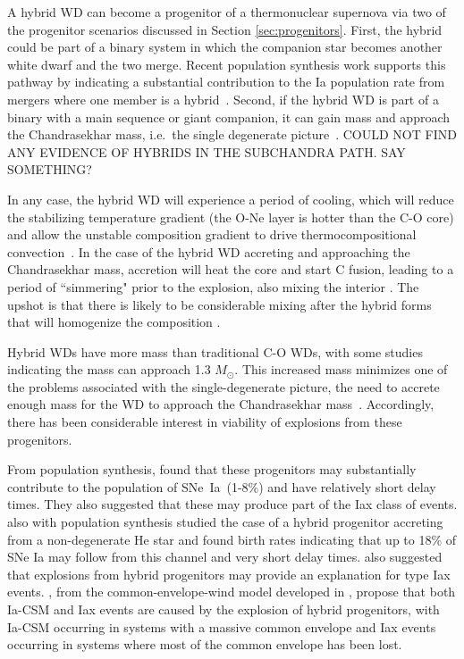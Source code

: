 \documentclass[iop,apj]{emulateapj}
\newcommand{\SNeIa}{SNe~Ia}
\newcommand{\Msun}{\ensuremath{M_\odot}}
\begin{document}
A hybrid WD can become a progenitor of a thermonuclear supernova via two
of the progenitor scenarios discussed in Section \ref{sec:progenitors}.
First, the hybrid could be part of a binary system in which the companion star becomes
another white dwarf and the two merge. Recent population synthesis work supports
this pathway by indicating a substantial contribution to the Ia population rate from
mergers where one member is a hybrid~\citep{yungelsonkuranov2017}. Second, if the hybrid
WD is part of a binary with a main sequence or giant companion, it can gain mass and
approach the Chandrasekhar mass, i.e.\  the single degenerate picture~\citep{willcoxetal2016}.
{\color{red} COULD NOT FIND ANY EVIDENCE OF HYBRIDS IN THE SUBCHANDRA PATH. SAY
SOMETHING?}

In any case, the hybrid WD will experience a period of cooling,
which will reduce the stabilizing temperature gradient (the O-Ne layer is hotter 
than the C-O core) and allow the unstable composition gradient to drive 
thermocompositional convection~\citep{brooksetal2017,schwabgaraud2019}.
In the case of the
hybrid WD accreting and approaching the Chandrasekhar mass, accretion will
heat the core and start C fusion, leading to a period of ``simmering" prior
to the explosion, also mixing the interior \citep{PiroBild08}. The upshot is 
that there is likely to be considerable mixing after the hybrid forms that will 
homogenize the composition \citep{denissenkovetal2015,brooksetal2017,schwabgaraud2019}.

Hybrid WDs have more mass than traditional C-O WDs, with some studies indicating the
mass can approach 1.3 \Msun \citep{chenetal2014}. This increased mass
minimizes one of the problems associated with the single-degenerate picture,
the need to accrete enough mass for the WD to approach the Chandrasekhar
mass~\citep{chenetal2014,denissenkovetal2015,kromeretal2015}.
Accordingly, there has been considerable interest in viability of explosions from
these progenitors.

From population synthesis, \citet{mengpods2014} found that these
progenitors may substantially contribute to the population of \SNeIa\ (1-8\%) and have
relatively short delay times. They also suggested that these
may produce part of the Iax class of events. \citet{Wangetal2014} also with population
synthesis studied the case
of a hybrid progenitor accreting from a non-degenerate He star and found
birth rates indicating that up to 18\% of SNe Ia may follow from this channel
and very short delay times. \citet{Wangetal2014} also suggested that explosions
from hybrid progenitors may provide an explanation for type Iax events.
\citet{mengpods2018}, from the common-envelope-wind model developed in
\citet{mengpods2014}, propose that both Ia-CSM and Iax events
are caused by the explosion of hybrid progenitors, with Ia-CSM occurring in systems with
a massive common envelope and Iax events occurring in systems where most of the common envelope
has been lost.
\end{document}

